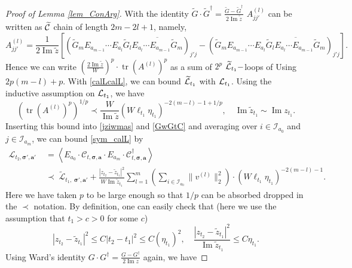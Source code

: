 \documentclass[10pt,reqno]{article}
\DeclareMathOperator{\im}{{\mathrm{Im}}}
\theoremstyle{plain} %
\theoremstyle{remark}
\numberwithin{equation}{section}
\begin{document}
\begin{proof}[Proof of Lemma \ref{lem_ConArg}]
With  the identity $\widetilde{G} \cdot \widetilde{G}^\dagger = \frac{\widetilde{G} - \widetilde{G}^\dagger}{2 \operatorname{Im} \widetilde{z}}$ 
$  A^{(l)}_{jj'}$ can be written as $\widetilde{\cal C}$ chain of length $2m-2l+1$, namely,   
$$
     A^{(l)}_{jj'}
     =  \frac{1}{2 \operatorname{Im}\widetilde{z}}
   \left[ \left(
    \widetilde{G}_m  E_{a_{m-1}}  \cdots E_{a_l}\widetilde{G}_l \overline{ E_{a_l} \cdots E_{a_{m-1}} \widetilde{G}_m}
  \right)_{j' j}   
  -
    \left(
    \widetilde{G}_m  E_{a_{m-1}}  \cdots E_{a_l}\overline{\widetilde{G}_l E_{a_l} \cdots E_{a_{m-1}} \widetilde{G}_m} \right)_{j' j} 
    \right].
$$
Hence we can write $\left( \frac{2 \operatorname{Im} \widetilde{z}}{W} \right)^p \cdot \operatorname{tr} \left( A^{(l)} \right)^p$
as a sum of $2^p$  $\widetilde{\cal L}_{t_1}-$loops of Using  $2p(m-l) + p$. With \eqref{calLcalL}, we can bound 
 $\widetilde{\cal L}_{t_1}$ with $ {\cal L}_{t_1}$.  Using  the inductive assumption on $ {\cal L}_{t_1}$, we have 
    $$
    \left( \operatorname{tr} \left( A^{(l)} \right)^p \right)^{1/p} 
    \prec \frac{W}{\operatorname{Im} \widetilde{z}} 
    \left( W \ell_{t_1} \eta_{t_1} \right)^{-2(m-l)-1+1/p}, \quad \im \widetilde{z}_{t_1}\sim \im z_{t_1}. 
    $$
Inserting  this bound  into \eqref{jziwmas} and \eqref{GwGtC} and averaging  over $i \in \mathcal{I}_{a_0}$ and $j \in \mathcal{I}_{a_m}$,  we can bound \eqref{sym_calL} by 
\begin{align}\label{LLVWL}
        \mathcal{L}_{t_2, \boldsymbol{\sigma}', \textbf{a}'} 
        & \; = \left\langle E_{a_0} \cdot \mathcal{C}_{t, \boldsymbol{\sigma}, \textbf{a}} \cdot E_{a_m} \cdot \mathcal{C}^\dagger_{t, \boldsymbol{\sigma}, \textbf{a}} \right\rangle 
     \nonumber    \\
         & \;  \prec \; \widetilde{\mathcal{L}}_{t_1 , \;  \boldsymbol{\sigma}' , \textbf{a}'} 
         +\frac{|z_{t_2}-\widetilde{z}_{t_1}|^2}{W\operatorname{Im} \widetilde{z}_{t_1}}
         \sum_{l=1}^m 
         \left(\sum_{i \in \mathcal{I}_{a_0}}  \|v^{(l)}\|_2^2\right)\cdot 
         \left( W \ell_{t_1} \eta_{t_1} \right)^{-2(m-l)-1}.
\end{align} 
Here we have taken $p$ to be large enough so that  $1/p$ can be absorbed dropped in  the $\prec$ notation.  
By definition, one can easily check that (here  we use the assumption that   $t_1>c>0$ for some $c$)
$$
    |z_{t_2}-\widetilde{z}_{t_1}|^2\le C |t_2-t_1|^2\le C\left(\eta _{t_1}\right)^2,\quad \frac{|z_{t_2}-\widetilde{z}_{t_1}|^2}{\operatorname{Im} \widetilde{z}_{t_1}}
    \le C \eta _{t_1} .
$$
Using Ward's  identity $G \cdot G^\dagger = \frac{G - G^\dagger}{2 \operatorname{Im} z}$ again, we have 

\end{proof}
\end{document}
